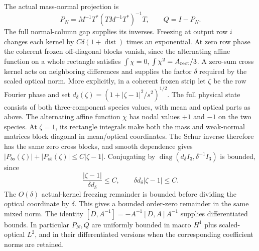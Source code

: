 \documentclass[11pt,a4paper]{article}
\numberwithin{equation}{section}
\theoremstyle{remark}
\newcommand{\PN}{P_{\!N}}
\newcommand{\diag}{\operatorname{diag}}
\begin{document}
The actual mass-normal projection is
\begin{equation}\label{eq:normal-projector}
 \PN=M^{-1}T^*(TM^{-1}T^*)^{-1}T,\qquad Q=I-\PN .
\end{equation}
The full normal-column gap supplies its inverses. Freezing at output
row \(i\) changes each kernel by
\(C\delta(1+\operatorname{dist})\) times an exponential. At zero
row phase the coherent frozen off-diagonal blocks vanish, since the
alternating affine function on a whole rectangle satisfies
\(\int\chi=0\), \(\int\chi^2=A_{\rm rect}/3\).
A zero-sum cross kernel acts on neighboring differences and supplies
the factor \(\delta\) required by the scaled optical norm.
More explicitly, in a coherent frozen strip let \(\zeta\) be the row
Fourier phase and set \(d_\delta(\zeta)=(1+|\zeta-1|^2/s^2)^{1/2}\).
The full physical state consists of both three-component species values,
with mean and optical parts as above. The alternating affine function
\(\chi\) has nodal values \(+1\) and \(-1\) on the two species.
At \(\zeta=1\), its rectangle integrals make both the mass and weak-normal
matrices block diagonal in mean/optical coordinates. The Schur inverse
therefore has the same zero cross blocks, and smooth dependence gives
\(|P_{bo}(\zeta)|+|P_{ob}(\zeta)|\leq C|\zeta-1|\).
Conjugating by \(\diag(d_\delta I_3,\delta^{-1}I_3)\) is bounded, since
\[
 \frac{|\zeta-1|}{\delta d_\delta}\leq C,\qquad
       \delta d_\delta|\zeta-1|\leq C.
\]
The \(O(\delta)\) actual-kernel freezing remainder is bounded before
dividing the optical coordinate by \(\delta\). This gives a bounded
order-zero remainder in the same mixed norm.
The identity \([D,A^{-1}]=-A^{-1}[D,A]A^{-1}\) supplies differentiated
bounds. In particular \(\PN,Q\) are uniformly bounded in macro
\(H^1\) plus scaled-optical \(L^2\), and in their differentiated versions
when the corresponding coefficient norms are retained.
\end{document}
